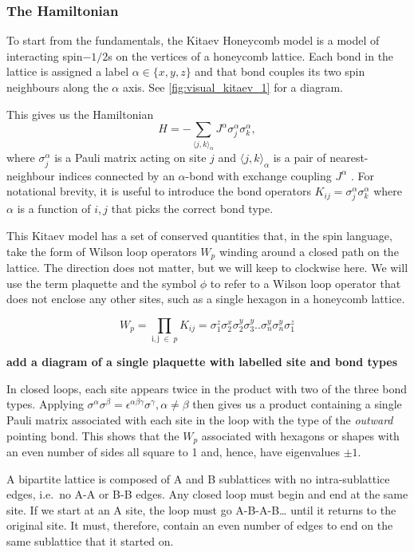 \hypertarget{the-hamiltonian}{%
\subsubsection{The Hamiltonian}\label{the-hamiltonian}}

To start from the fundamentals, the Kitaev Honeycomb model is a model of interacting spin\(-1/2\)s on the vertices of a honeycomb lattice. Each bond in the lattice is assigned a label \(\alpha \in \{ x, y, z\}\) and that bond couples its two spin neighbours along the \(\alpha\) axis. See \cref{fig:visual_kitaev_1} for a diagram.

This gives us the Hamiltonian \[H =  - \sum_{\langle j,k\rangle_\alpha} J^{\alpha}\sigma_j^{\alpha}\sigma_k^{\alpha},\] where \(\sigma^\alpha_j\) is a Pauli matrix acting on site \(j\) and \(\langle j,k\rangle_\alpha\) is a pair of nearest-neighbour indices connected by an \(\alpha\)-bond with exchange coupling \(J^\alpha\) \autocite{kitaevAnyonsExactlySolved2006}. For notational brevity, it is useful to introduce the bond operators \(K_{ij} = \sigma_j^{\alpha}\sigma_k^{\alpha}\) where \(\alpha\) is a function of \(i,j\) that picks the correct bond type.

This Kitaev model has a set of conserved quantities that, in the spin language, take the form of Wilson loop operators \(W_p\) winding around a closed path on the lattice. The direction does not matter, but we will keep to clockwise here. We will use the term plaquette and the symbol \(\phi\) to refer to a Wilson loop operator that does not enclose any other sites, such as a single hexagon in a honeycomb lattice.

\[W_p = \prod_{\mathrm{i,j}\; \in\; p} K_{ij} = \sigma_1^z \sigma_2^x \sigma_2^y \sigma_3^y .. \sigma_n^y \sigma_n^y \sigma_1^z\]

\textbf{add a diagram of a single plaquette with labelled site and bond types}

In closed loops, each site appears twice in the product with two of the three bond types. Applying \(\sigma^\alpha \sigma^\beta = \epsilon^{\alpha \beta \gamma} \sigma^\gamma, \alpha \neq \beta\) then gives us a product containing a single Pauli matrix associated with each site in the loop with the type of the \emph{outward} pointing bond. This shows that the \(W_p\) associated with hexagons or shapes with an even number of sides all square to 1 and, hence, have eigenvalues \(\pm 1\).

A bipartite lattice is composed of A and B sublattices with no intra-sublattice edges, i.e.~no A-A or B-B edges. Any closed loop must begin and end at the same site. If we start at an A site, the loop must go A-B-A-B\ldots{} until it returns to the original site. It must, therefore, contain an even number of edges to end on the same sublattice that it started on.

